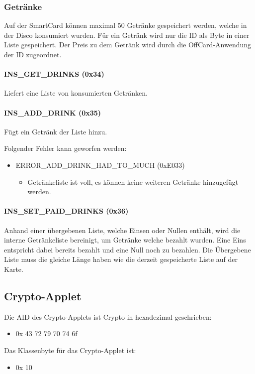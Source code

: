 \subsubsection{Getränke}
Auf der SmartCard können maximal 50 Getränke gespeichert werden, welche in der Disco konsumiert wurden.
Für ein Getränk wird nur die ID als Byte in einer Liste gespeichert.
Der Preis zu dem Getränk wird durch die OffCard-Anwendung der ID zugeordnet.
	
\paragraph{INS\_GET\_DRINKS (0x34)}
Liefert eine Liste von konsumierten Getränken.
\paragraph{INS\_ADD\_DRINK (0x35)}
Fügt ein Getränk der Liste hinzu.

Folgender Fehler kann geworfen werden:
\begin{itemize}
	\item ERROR\_ADD\_DRINK\_HAD\_TO\_MUCH (0xE033)
	\begin{itemize}
		\item Getränkeliste ist voll, es können keine weiteren Getränke hinzugefügt werden.
	\end{itemize}
\end{itemize}

\paragraph{INS\_SET\_PAID\_DRINKS (0x36)}
Anhand einer übergebenen Liste, welche Einsen oder Nullen enthält, wird die interne Getränkeliste bereinigt, um Getränke welche bezahlt wurden.
Eine Eins entspricht dabei bereits bezahlt und eine Null noch zu bezahlen.
Die Übergebene Liste muss die gleiche Länge haben wie die derzeit gespeicherte Liste auf der Karte.

\subsection{Crypto-Applet}
Die AID des Crypto-Applets ist Crypto in hexadezimal geschrieben:
\begin{itemize}
	\item 0x 43 72 79 70 74 6f
\end{itemize}
Das Klassenbyte für das Crypto-Applet ist:
\begin{itemize}
	\item 0x 10
\end{itemize}

